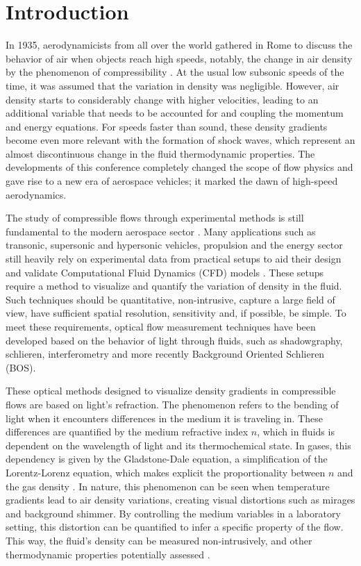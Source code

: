 \chapter{Introduction}
\label{chapter: introduction}

\par In 1935, aerodynamicists from all over the world gathered in Rome to discuss the behavior of air when objects reach high speeds, notably, the change in air density by the phenomenon of compressibility \cite{TheBookOfAnderson}. At the usual low subsonic speeds of the time, it was assumed that the variation in density was negligible. However, air density starts to considerably change with higher velocities, leading to an additional variable that needs to be accounted for and coupling the momentum and energy equations. For speeds faster than sound, these density gradients become even more relevant with the formation of shock waves, which represent an almost discontinuous change in the fluid thermodynamic properties. The developments of this conference completely changed the scope of flow physics and gave rise to a new era of aerospace vehicles; it marked the dawn of high-speed aerodynamics.

\par The study of compressible flows through experimental methods is still fundamental to the modern aerospace sector \cite{TheBookOfAnderson}. Many applications such as transonic, supersonic and hypersonic vehicles, propulsion and the energy sector still heavily rely on experimental data from practical setups to aid their design and validate Computational Fluid Dynamics (CFD) models \cite{Raffel2001}. These setups require a method to visualize and quantify the variation of density in the fluid. Such techniques should be quantitative, non-intrusive, capture a large field of view, have sufficient spatial resolution, sensitivity and, if possible, be simple. To meet these requirements, optical flow measurement techniques have been developed based on the behavior of light through fluids, such as shadowgraphy, schlieren, interferometry and more recently Background Oriented Schlieren (BOS).

\par These optical methods designed to visualize density gradients in compressible flows are based on light's refraction. The phenomenon refers to the bending of light when it encounters differences in the medium it is traveling in. These differences are quantified by the medium refractive index $n$, which in fluids is dependent on the wavelength of light and its thermochemical state. In gases, this dependency is given by the Gladstone-Dale equation, a simplification of the Lorentz-Lorenz equation, which makes explicit the proportionality between $n$ and the gas density \cite{Schmidt2025}. In nature, this phenomenon can be seen when temperature gradients lead to air density variations, creating visual distortions such as mirages and background shimmer. By controlling the medium variables in a laboratory setting, this distortion can be quantified to infer a specific property of the flow. This way, the fluid's density can be measured non-intrusively, and other thermodynamic properties potentially assessed \cite{Michalski2018}.

